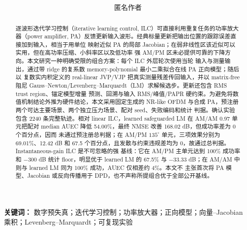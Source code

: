 \documentclass[UTF8,zihao=-4,a4paper]{ctexart}
\title{\PaperTitleCN\\[0.5em]\large\PaperTitleEN}
\author{匿名作者}
\date{}
\begin{document}
\maketitle

\begin{abstract}
逐波形迭代学习控制（iterative learning control, ILC）可直接利用重复任务的功率放大器（power
amplifier, PA）反馈更新输入波形。经典标量更新把输出位置的跟踪误差直接加到输入，相当于用单位
映射近似 PA 的局部 Jacobian；在弱非线性区该近似可以实用，但在高功率压缩、小斜率区以及低功率
强 AM/PM 区未必提供可靠的下降方向。本文研究一种明确受限的组合方案：每个 ILC 外层轮次使用当轮
输入与测量输出，通过带 ridge 的复系数 memory-polynomial 最小二乘拟合在线 PA 正向模型；随后以
复数实内积定义的 real-linear JVP/VJP 把真实测量残差传回输入，并以 matrix-free 阻尼
Gauss--Newton/Levenberg--Marquardt（LM）求解候选步。更新还包含 RMS trust region、锚定模型增量
预测、回溯与输入 RMS/峰值/PAPR 硬约束。为避免将数值机制结论外推为硬件结论，本文采用固定生成的
NR-like OFDM 与合成 PA，预注册两个可达主要场景、两个独立压力场景、配对 seed、失败编码和统计
判据。确认实验包含 2240 条完整轨迹。相对 linear ILC，learned safeguarded LM 在 AM/AM 0.97
单元把配对 median AUEC 降低 54.00\%，最终 NMSE 改善 168.02 dB，但成功率差为 0 个百分点，因而
未通过预注册总判据；在 AM/PM $135^\circ$ 单元，三项效果分别为 69.01\%、12.42 dB 和
67.5 个百分点，且发散与约束违规差均为 0，故通过总判据。Instantaneous-gain ILC 是不可忽略的强
基线：它在 AM/PM 主单元达到 100\% 成功率和 $-300$ dB 统计 floor，明显优于 learned LM 的
67.5\% 与 $-33.33$ dB；在 AM/AM 中则与 learned LM 同为 100\% 成功，AUEC 仅相差约 4\%。本文不
主张首次将 PA 模型、Jacobian 或反向传播用于 DPD，也不声称所提组合优于全部公开基线。
\end{abstract}

\noindent\textbf{关键词：} 数字预失真；迭代学习控制；功率放大器；正向模型；向量--Jacobian
乘积；Levenberg--Marquardt；可复现实验
\end{document}
